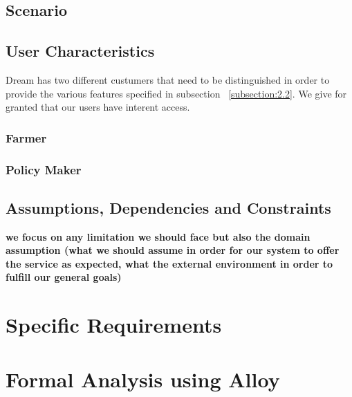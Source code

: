 \documentclass{article}
\begin{document}
\subsection{Scenario}

\subsection{User Characteristics}
Dream has two different custumers that need to be 
distinguished in order to provide the various 
features specified in subsection ~\ref{subsection:2.2}. 
We give for granted that our users have interent access.
\subsubsection{Farmer}
\subsubsection{Policy Maker}


\subsection{Assumptions, Dependencies and Constraints}
\textbf{we focus on any limitation we should face but also the domain assumption 
(what we should assume in order for our system to offer the service as expected, 
what the external environment in order to fulfill our general goals)}

\section{Specific Requirements}

\section{Formal Analysis using Alloy}
\end{document}
